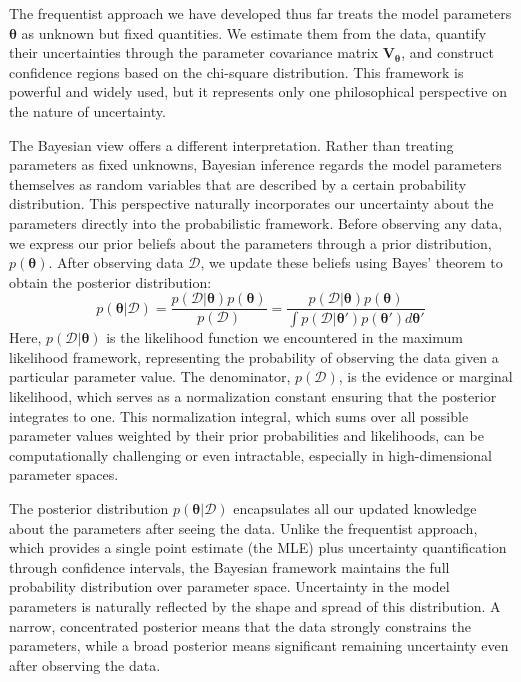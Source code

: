 The frequentist approach we have developed thus far treats the model parameters $\boldsymbol{\theta}$ as unknown but fixed quantities. We estimate them from the data, quantify their uncertainties through the parameter covariance matrix $\mathbf{V}_{\boldsymbol{\theta}}$, and construct confidence regions based on the chi-square distribution. This framework is powerful and widely used, but it represents only one philosophical perspective on the nature of uncertainty.

The Bayesian view offers a different interpretation. Rather than treating parameters as fixed unknowns, Bayesian inference regards the model parameters themselves as random variables that are described by a certain probability distribution. This perspective naturally incorporates our uncertainty about the parameters directly into the probabilistic framework. Before observing any data, we express our prior beliefs about the parameters through a prior distribution, $p(\boldsymbol{\theta})$. After observing data $\mathcal{D}$, we update these beliefs using Bayes' theorem to obtain the posterior distribution:
\begin{equation}
    p(\boldsymbol{\theta}|\mathcal{D}) = \frac{p(\mathcal{D}|\boldsymbol{\theta})p(\boldsymbol{\theta})}{p(\mathcal{D})} = \frac{p(\mathcal{D}|\boldsymbol{\theta})p(\boldsymbol{\theta})}{\int p(\mathcal{D}|\boldsymbol{\theta}')p(\boldsymbol{\theta}')d\boldsymbol{\theta}'}
\end{equation}
Here, $p(\mathcal{D}|\boldsymbol{\theta})$ is the likelihood function we encountered in the maximum likelihood framework, representing the probability of observing the data given a particular parameter value. The denominator, $p(\mathcal{D})$, is the evidence or marginal likelihood, which serves as a normalization constant ensuring that the posterior integrates to one. This normalization integral, which sums over all possible parameter values weighted by their prior probabilities and likelihoods, can be computationally challenging or even intractable, especially in high-dimensional parameter spaces.

The posterior distribution $p(\boldsymbol{\theta}|\mathcal{D})$ encapsulates all our updated knowledge about the parameters after seeing the data. Unlike the frequentist approach, which provides a single point estimate (the MLE) plus uncertainty quantification through confidence intervals, the Bayesian framework maintains the full probability distribution over parameter space. Uncertainty in the model parameters is naturally reflected by the shape and spread of this distribution. A narrow, concentrated posterior means that the data strongly constrains the parameters, while a broad posterior means significant remaining uncertainty even after observing the data.


